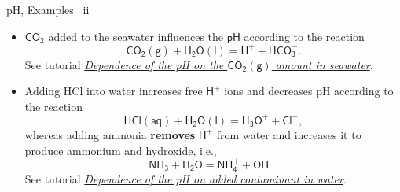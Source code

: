 %
\begin{frame}{pH, Examples \, ii}
\footnotesize
\lcol

\begin{itemize}
\item $\mathsf{CO_2}$ added to the seawater influences the $\mathsf{pH}$ according to the reaction
%
\[
\mathsf{CO_2(g) + H_2O(l) = H^+ + HCO_3^-.}
\]
% 
See tutorial \href{https://reaktoro.org/applications/miscellaneous/ph-dependence-on-co2-addition-in-seawater.html}{\textcolor{indigo(dye)}{\it Dependence of the pH on the $\mathsf{CO_2(g)}$ amount in seawater}}.
%
\pause
\vskip 10pt
\pause
\item Adding HCl into water increases free $\mathsf{H^+}$ ions and decreases pH according to the reaction 
%
\[
\mathsf{HCl(aq) + H_2O(l) = H_3O^+ + Cl^-,}
\]
%
whereas 
%
%
adding ammonia \textbf{removes} $\mathsf{H^+}$ from water and increases it to produce ammonium and hydroxide, i.e., 
%
\[
\mathsf{NH_3 + H_2O = NH_4^+ + OH^-.}
\]
%
%
% 
See tutorial \href{https://reaktoro.org/applications/miscellaneous/ph-dependence-on-contaminants-in-water.html}{\textcolor{indigo(dye)}{\it Dependence of the pH on added contaminant in water}}.


\end{itemize}
\end{frame}
